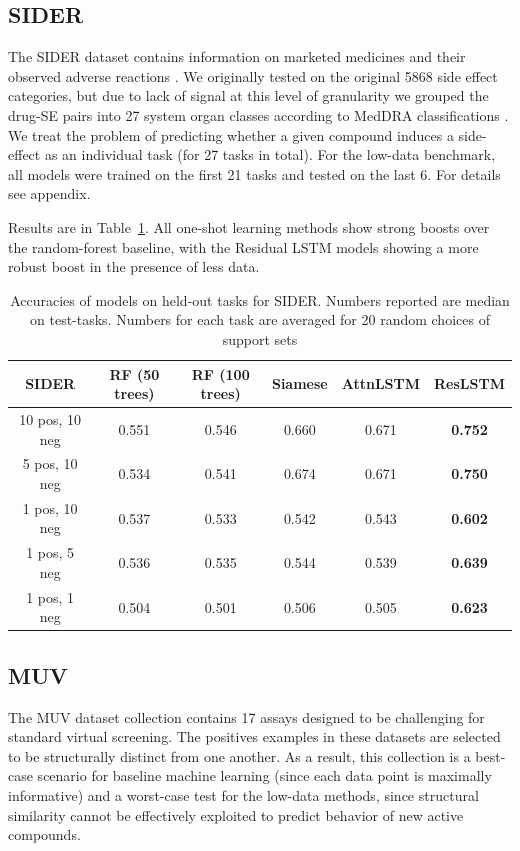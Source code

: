 \documentclass[journal=jacsat,manuscript=article]{achemso}
\begin{document}
\subsection{SIDER}

The SIDER dataset contains information on marketed medicines and their observed adverse reactions \cite{kuhn2015sider}. We originally tested on the original 5868 side effect categories, but due to lack of signal at this level of granularity we grouped the drug-SE pairs into 27 system organ classes according to MedDRA classifications \cite{meddra}. We treat the problem of predicting whether a given compound induces a side-effect as an individual task (for 27 tasks in total). For the low-data benchmark, all models were trained on the first 21 tasks and tested on the last 6. For details see appendix.

Results are in Table~\ref{tab:sider}. All one-shot learning methods show strong boosts over the random-forest baseline, with the Residual LSTM models showing a more robust boost in the presence of less data.

\begin{table}
    \centering
    \begin{tabular}{ |c|c|c|c|c|c| } 
    \hline
    SIDER & RF (50 trees) & RF (100 trees) & Siamese & AttnLSTM & ResLSTM \\ 
    \hline
    10 pos, 10 neg & 0.551 & 0.546 & 0.660 & 0.671 & \textbf{0.752} \\
    \hline
    5 pos, 10 neg & 0.534 & 0.541 & 0.674 & 0.671 & \textbf{0.750} \\ 
    \hline
    1 pos, 10 neg & 0.537 & 0.533 & 0.542 & 0.543 & \textbf{0.602} \\ 
    \hline
    1 pos, 5 neg & 0.536 & 0.535 & 0.544 & 0.539 & \textbf{0.639} \\ 
    \hline
    1 pos, 1 neg & 0.504 & 0.501 & 0.506 & 0.505 & \textbf{0.623} \\ 
    \hline
    \end{tabular}
    \caption{Accuracies of models on held-out tasks for SIDER. Numbers reported are median on test-tasks. Numbers for each task are averaged for 20 random choices of support sets}
    \label{tab:sider}
\end{table}

\subsection{MUV}
The MUV dataset collection \cite{rohrer2009maximum} contains 17 assays designed to be challenging for standard virtual screening. The positives examples in these datasets are selected to be structurally distinct from one another. As a result, this collection is a best-case scenario for baseline machine learning (since each data point is maximally informative) and a worst-case test for the low-data methods, since structural similarity cannot be effectively exploited to predict behavior of new active compounds.
\end{document}
